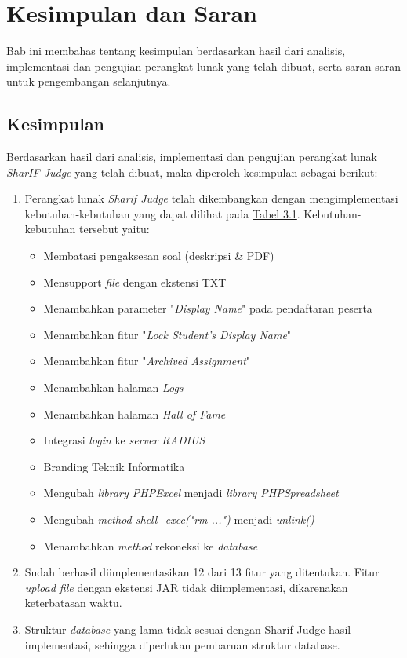 \chapter{Kesimpulan dan Saran}
\label{chap:kesimpulan dan saran}

Bab ini membahas tentang kesimpulan berdasarkan hasil dari analisis, implementasi dan pengujian perangkat lunak yang telah dibuat, serta saran-saran untuk pengembangan selanjutnya.

\section{Kesimpulan}
Berdasarkan hasil dari analisis, implementasi dan pengujian perangkat lunak \textit{SharIF Judge} yang telah dibuat, maka diperoleh kesimpulan sebagai berikut:
\begin{enumerate}
	\item Perangkat lunak \textit{Sharif Judge} telah dikembangkan dengan mengimplementasi kebutuhan-kebutuhan yang dapat dilihat pada \hyperref[tab:kebutuhan]{Tabel 3.1}. Kebutuhan-kebutuhan tersebut yaitu:
	\begin{itemize}
		\item Membatasi pengaksesan soal (deskripsi \& PDF)
		\item Mensupport \textit{file} dengan ekstensi TXT
		\item Menambahkan parameter "\textit{Display Name}" pada pendaftaran peserta
		\item Menambahkan fitur "\textit{Lock Student's Display Name}"
		\item Menambahkan fitur "\textit{Archived Assignment}"
		\item Menambahkan halaman \textit{Logs}
		\item Menambahkan halaman \textit{Hall of Fame}
		\item Integrasi \textit{login} ke \textit{server RADIUS}
		\item Branding Teknik Informatika
		\item Mengubah \textit{library PHPExcel} menjadi \textit{library PHPSpreadsheet}
		\item Mengubah \textit{method shell\_exec("rm ...")} menjadi\textit{ unlink()}
		\item Menambahkan \textit{method} rekoneksi ke \textit{database}
	\end{itemize}

	\item Sudah berhasil diimplementasikan 12 dari 13 fitur yang ditentukan. Fitur \textit{upload file} dengan ekstensi JAR tidak diimplementasi, dikarenakan keterbatasan waktu.
	
	\item Struktur \textit{database} yang lama tidak sesuai dengan Sharif Judge hasil implementasi, sehingga diperlukan pembaruan struktur database.
\end{enumerate}

